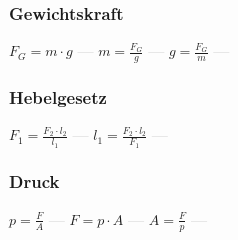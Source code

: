 \subsubsection{Gewichtskraft} 
\begin{minipage}{0.45\textwidth} 
\end{minipage} 
\begin{minipage}{0.45\textwidth} 
 
\end{minipage} 
$ F_{G}  = m\cdot g $ \textcolor{lightgray}{\textbf{---}} 
$ m = \frac{F_{G} }{g} $ \textcolor{lightgray}{\textbf{---}} 
$ g = \frac{F_{G} }{m} $ \textcolor{lightgray}{\textbf{---}} 

\subsubsection{Hebelgesetz} 
\begin{minipage}{0.45\textwidth} 
\end{minipage} 
\begin{minipage}{0.45\textwidth} 
 
\end{minipage} 
$ F_{1}  = \frac{F_{2} \cdot l_{2} }{ l_{1} } $ \textcolor{lightgray}{\textbf{---}} 
$ l_{1}  = \frac{F_{2} \cdot l_{2} }{ F_{1} } $ \textcolor{lightgray}{\textbf{---}} 

\subsubsection{Druck} 
\begin{minipage}{0.45\textwidth} 
\end{minipage} 
\begin{minipage}{0.45\textwidth} 
 
\end{minipage} 
$ p = \frac{F}{A} $ \textcolor{lightgray}{\textbf{---}} 
$ F = p\cdot A $ \textcolor{lightgray}{\textbf{---}} 
$ A = \frac{F}{p} $ \textcolor{lightgray}{\textbf{---}} 

